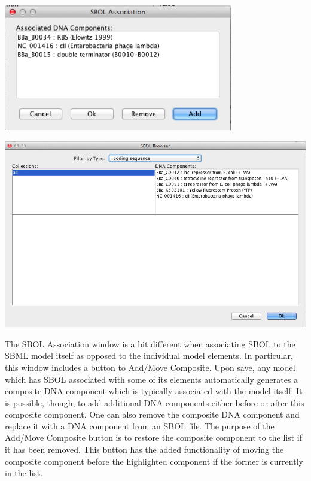 \documentclass[titlepage,11pt]{article}
\begin{document}
\begin{center}
\includegraphics[width=100mm]{screenshots/AssociateSBOL}
\end{center}

\begin{center}
\includegraphics[width=160mm]{screenshots/AssociateSBOLBrowser}
\end{center}

The SBOL Association window is a bit different when associating SBOL to the SBML model itself as opposed to the individual model elements.  In particular, this window includes a button to Add/Move Composite.  Upon save, any model which has SBOL associated with some of its elements automatically generates a composite DNA component which is typically associated with the model itself.  It is possible, though, to add additional DNA components either before or after this composite component.  One can also remove the composite DNA component and replace it with a DNA component from an SBOL file.  The purpose of the Add/Move Composite button is to restore the composite component to the list if it has been removed.  This button has the added functionality of moving the composite component before the highlighted component if the former is currently in the list.
\end{document}
